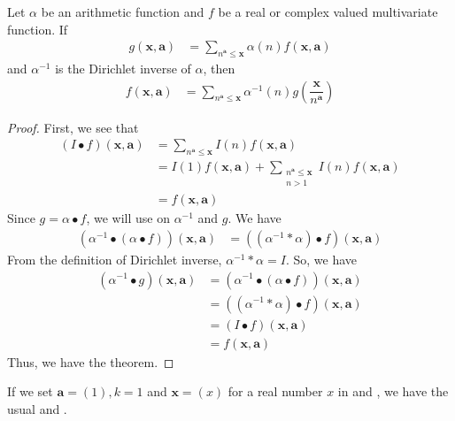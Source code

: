 \documentclass[elemannt.tex]{subfile}
\begin{document}
		\begin{theorem}\label{thm:geninverse}
			Let $\alpha$ be an arithmetic function and $f$ be a real or complex valued multivariate function. If
				\begin{align*}
					g(\mathbf{x}, \mathbf{a})
						& = \sum_{n^{\mathbf{a}}\leq\mathbf{x}}\alpha(n)f(\mathbf{x}, \mathbf{a})
				\end{align*}
			and $\alpha^{-1}$ is the Dirichlet inverse of $\alpha$, then
				\begin{align*}
					f(\mathbf{x}, \mathbf{a})
						& = \sum_{n^{\mathbf{a}}\leq\mathbf{x}}\alpha^{-1}(n)g\left(\dfrac{\mathbf{x}}{n^{\mathbf{a}}}\right)
				\end{align*}
			
				\begin{proof}
					First, we see that
						\begin{align*}
							(I\bullet f)(\mathbf{x},\mathbf{a})
								& = \sum_{n^{\mathbf{a}}\leq\mathbf{x}}I(n)f(\mathbf{x},\mathbf{a})\\
								& = I(1)f(\mathbf{x},\mathbf{a})+\sum_{\substack{n^{\mathbf{a}}\leq{\mathbf{x}}\\n>1}}I(n)f(\mathbf{x},\mathbf{a})\\
								& = f(\mathbf{x},\mathbf{a})
						\end{align*}
					Since $g=\alpha\bullet f$, we will use  on $\alpha^{-1}$ and $g$. We have
						\begin{align*}
							(\alpha^{-1}\bullet(\alpha\bullet f))(\mathbf{x},\mathbf{a})
								& = ((\alpha^{-1}\ast\alpha)\bullet f)(\mathbf{x},\mathbf{a})
						\end{align*}
					From the definition of Dirichlet inverse, $\alpha^{-1}\ast\alpha=I$. So, we have
						\begin{align*}
							(\alpha^{-1}\bullet g)(\mathbf{x},\mathbf{a})
								& = (\alpha^{-1}\bullet(\alpha\bullet f))(\mathbf{x},\mathbf{a})\\
								& = ((\alpha^{-1}\ast\alpha)\bullet f)(\mathbf{x}, \mathbf{a})\\
								& = (I\bullet f)(\mathbf{x},\mathbf{a})\\
								& = f(\mathbf{x},\mathbf{a})
						\end{align*}
					Thus, we have the theorem.
				\end{proof}
		\end{theorem}
	If we set $\mathbf{a}=(1),k=1$ and $\mathbf{x}=(x)$ for a real number $x$ in  and , we have the usual  and .
\end{document}
